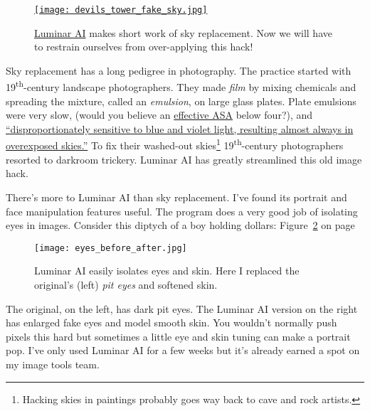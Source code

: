 
\begin{figure}[htbp]
\centering
\href{https://conceptcontrol.smugmug.com/Themes/Manipulations/Fake-Pixels/i-jft2zQ3/A}{\texttt{[image: devils\_tower\_fake\_sky.jpg]}}
\caption{\href{https://skylum.com/luminar-ai-b}{Luminar AI} makes short work of sky replacement. Now we
will have to restrain ourselves from over-applying this hack!} 
\label{fig:7048X2}
\end{figure}

Sky replacement has a long pedigree in photography. The practice started
with 19\textsuperscript{th}-century landscape photographers. They made
\emph{film} by mixing chemicals and spreading the mixture, called an
\emph{emulsion}, on large glass plates. Plate emulsions were very slow,
(would you believe an
\href{https://en.wikipedia.org/wiki/Film_speed}{effective ASA} below
four?), and
\href{https://www.nytimes.com/2012/10/12/arts/design/faking-it-at-the-met-a-photography-exhibition.html}{``disproportionately
sensitive to blue and violet light, resulting almost always in
overexposed skies.''} To fix their washed-out
skies\footnote{Hacking skies in paintings probably 
goes way back to cave and rock artists.
} 19\textsuperscript{th}-century photographers resorted to darkroom
trickery. Luminar AI has greatly streamlined this old image hack.

There's more to Luminar AI than sky replacement. I've found its portrait
and face manipulation features useful. The program does a very good job
of isolating eyes in images. Consider this diptych of a boy holding
dollars: Figure~\ref{fig:7048X3} on page~\pageref{fig:7048X3}


\begin{figure}[htbp]
\centering
\texttt{[image: eyes\_before\_after.jpg]}
\caption{Luminar AI easily isolates eyes and skin. Here I 
replaced the original's (left)  \emph{pit eyes} and softened skin.} 
\label{fig:7048X3}
\end{figure}

The original, on the left, has dark pit eyes. The Luminar AI version on
the right has enlarged fake eyes and model smooth skin. You wouldn't
normally push pixels this hard but sometimes a little eye and skin
tuning can make a portrait pop. I've only used Luminar AI for a few
weeks but it's already earned a spot on my image tools team.

